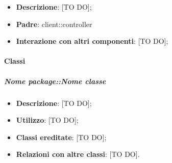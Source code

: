 \begin{itemize}
	\item \textbf{Descrizione}: [TO DO];
	\item \textbf{Padre}: client::controller
	\item \textbf{Interazione con altri componenti}: [TO DO];
\end{itemize}

	\paragraph{Classi} %
		\subparagraph{Nome package::Nome classe} %
		\label{subp:subparagraph_name}
			\begin{itemize}
				\item \textbf{Descrizione}: [TO DO];
				\item \textbf{Utilizzo}: [TO DO];
				\item \textbf{Classi ereditate}: [TO DO];
				\item \textbf{Relazioni con altre classi}: [TO DO].
			\end{itemize}
